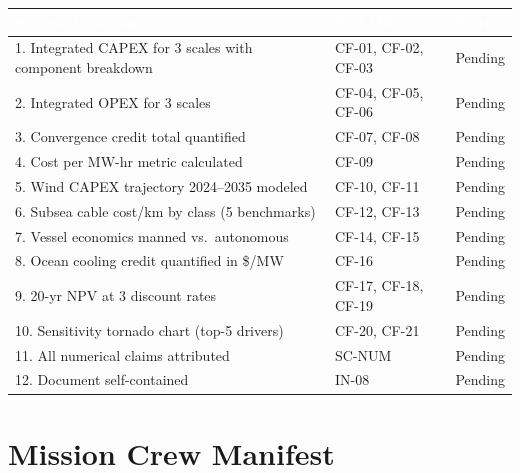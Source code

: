 \documentclass[11pt,letterpaper]{article}
\newcommand{\tableheader}[1]{\textbf{\sffamily\textcolor{white}{#1}}}
\begin{document}
\begin{center}
\begin{tabularx}{\textwidth}{L{7cm}L{3cm}C{1.5cm}}
\toprule
{}
\tableheader{Success Criterion} & \tableheader{Test ID(s)} & \tableheader{Status} \\
. Integrated CAPEX for 3 scales with component breakdown & CF-01, CF-02, CF-03 & Pending \\
2. Integrated OPEX for 3 scales & CF-04, CF-05, CF-06 & Pending \\
3. Convergence credit total quantified & CF-07, CF-08 & Pending \\
4. Cost per MW-hr metric calculated & CF-09 & Pending \\
5. Wind CAPEX trajectory 2024--2035 modeled & CF-10, CF-11 & Pending \\
6. Subsea cable cost/km by class (5 benchmarks) & CF-12, CF-13 & Pending \\
7. Vessel economics manned vs.\ autonomous & CF-14, CF-15 & Pending \\
8. Ocean cooling credit quantified in \$/MW & CF-16 & Pending \\
9. 20-yr NPV at 3 discount rates & CF-17, CF-18, CF-19 & Pending \\
10. Sensitivity tornado chart (top-5 drivers) & CF-20, CF-21 & Pending \\
11. All numerical claims attributed & SC-NUM & Pending \\
12. Document self-contained & IN-08 & Pending \\
\bottomrule
\end{tabularx}
\end{center}

\section{Mission Crew Manifest}
\end{document}

